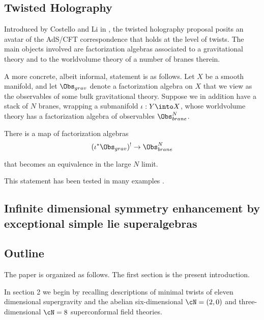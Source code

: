 \subsection{Twisted Holography}
Introduced by Costello and Li in \cite{CLsugra}, the twisted holography proposal posits an avatar of the AdS/CFT correspondence that holds at the level of twists. The main objects involved are factorization algebras associated to a gravitational theory and to the worldvolume theory of a number of branes therein.

A more concrete, albeit informal, statement is as follows. Let $X$ be a smooth manifold, and let $\Obs_{grav}$ denote a factorization algebra on $X$ that we view as the observables of some bulk gravitational theory. Suppose we in addition have a stack of $N$ branes, wrapping a submanifold $\iota: Y\into X$, whose worldvolume theory has a factorization algebra of observables $\Obs^{N}_{brane}$.

\begin{}
  There is a map of factorization algebras
  \[
        (\iota^{*}\Obs_{grav})^{!}\to \Obs^{N}_{brane}
  \]

      that becomes an equivalence in the large $N$ limit.
    \end{}

    This statement has been tested in many examples \cite{}.


\subsection{Infinite dimensional symmetry enhancement by exceptional simple lie superalgebras}

\subsection{Outline}

The paper is organized as follows. The first section is the present introduction.

In section 2 we begin by recalling descriptions of minimal twists of eleven dimensional supergravity \cite{} and the abelian six-dimensional $\cN=(2,0)$ \cite{} and three-dimensional $\cN=8$ \cite{} superconformal field theories.

%
